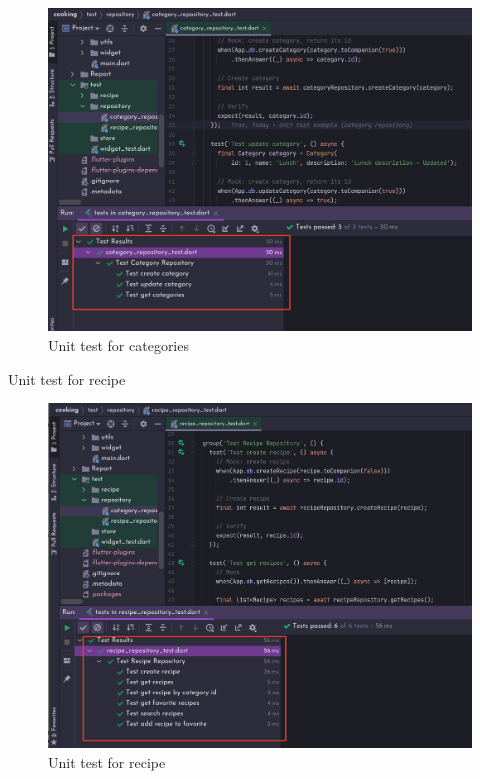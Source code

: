 \documentclass{article}
\begin{document}
    \begin{figure}[h!]
            \centering
            \includegraphics[scale=0.13]{Images/unit-test-for-recipe.png}
            \caption{Unit test for categories}
            \label{fig:cookingbook}
    \end{figure}
Unit test for recipe
    \begin{figure}[h!]
            \centering
            \includegraphics[scale=0.13]{Images/unit-test-repo.png}
            \caption{Unit test for recipe }
            \label{fig:cookingbook}
    \end{figure}
\newpage
\end{document}
